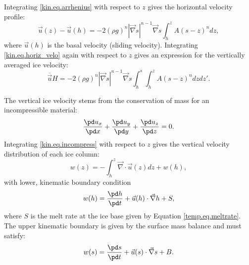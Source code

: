Integrating \eqref{kin.eq.arrhenius} with respect to $z$ gives the horizontal velocity profile:
\begin{equation}
  \label{kin.eq.horiz_velo}
  \vec u(z)-\vec u(h) = -2(\rho g)^n|\vec\nabla s|^{n-1}\vec\nabla s\int_h^zA(s-z)^ndz,
\end{equation}
where $\vec u(h)$ is the basal velocity (sliding velocity). Integrating \eqref{kin.eq.horiz_velo} again with respect to $z$ gives an expression for the vertically averaged ice velocity:
\begin{equation}
  \label{kin.eq.avg_velo}
  \overline{\vec u}H=-2(\rho g)^n|\vec\nabla s|^{n-1}\vec\nabla s\int_h^s\int_h^zA(s-z)^ndzdz'.
\end{equation}

The vertical ice velocity stems from the conservation of mass for an incompressible material:
\begin{equation}
  \label{kin.eq.incompress}
  \frac{\pd u_x}{\pd x} + \frac{\pd u_y}{\pd y} + \frac{\pd u_z}{\pd z} = 0.
\end{equation}
Integrating \eqref{kin.eq.incompress} with respect to $z$ gives the vertical velocity distribution of each ice column:
\begin{equation}
  \label{kin.eq.vert_velo}
  w(z)=-\int_h^z\vec\nabla\cdot\vec u(z)dz+w(h),
\end{equation}
with lower, kinematic boundary condition
\begin{equation}
  w(h)=\frac{\pd h}{\pd t}+\vec u(h)\cdot\vec\nabla h+S,
\end{equation}
where $S$ is the melt rate at the ice base given by Equation \eqref{temp.eq.meltrate}. The upper kinematic boundary is given by the surface mass balance and must satisfy:
\begin{equation}
  \label{kin.eq.upper_bc}
  w(s)=\frac{\pd s}{\pd t}+\vec u(s)\cdot\vec\nabla s+B.
\end{equation}




